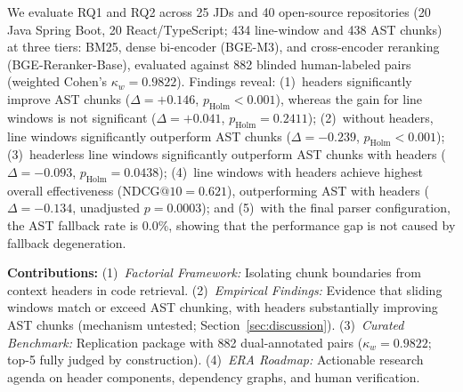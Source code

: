 We evaluate RQ1 and RQ2 across 25 JDs and 40 open-source repositories (20 Java Spring Boot, 20 React/TypeScript; 434 line-window and 438 AST chunks) at three tiers: BM25, dense bi-encoder (BGE-M3), and cross-encoder reranking (BGE-Reranker-Base), evaluated against 882 blinded human-labeled pairs (weighted Cohen's $\kappa_w = 0.9822$). 
Findings reveal: (1)~headers significantly improve AST chunks ($\Delta = +0.146$, $p_{\mathrm{Holm}} < 0.001$), whereas the gain for line windows is not significant ($\Delta = +0.041$, $p_{\mathrm{Holm}} = 0.2411$); (2)~without headers, line windows significantly outperform AST chunks ($\Delta = -0.239$, $p_{\mathrm{Holm}} < 0.001$); (3)~headerless line windows significantly outperform AST chunks with headers ($\Delta = -0.093$, $p_{\mathrm{Holm}} = 0.0438$); (4)~line windows with headers achieve highest overall effectiveness ($\text{NDCG@10} = 0.621$), outperforming AST with headers ($\Delta = -0.134$, unadjusted $p = 0.0003$); and (5)~with the final parser configuration, the AST fallback rate is $0.0\%$, showing that the performance gap is not caused by fallback degeneration.

\textbf{Contributions:} (1)~\textit{Factorial Framework:} Isolating chunk boundaries from context headers in code retrieval. (2)~\textit{Empirical Findings:} Evidence that sliding windows match or exceed AST chunking, with headers substantially improving AST chunks (mechanism untested; Section~\ref{sec:discussion}). (3)~\textit{Curated Benchmark:} Replication package with 882 dual-annotated pairs ($\kappa_w = 0.9822$; top-5 fully judged by construction). (4)~\textit{ERA Roadmap:} Actionable research agenda on header components, dependency graphs, and human verification.
